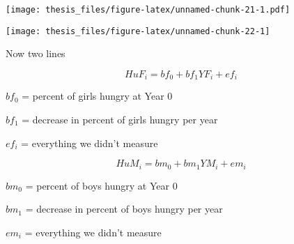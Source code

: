 \documentclass[12pt,openright,oneside,a4paper,chapter=TITLE,section=TITLE,subsection=Title,english,french,spanish,portugues,sumario=tradicional]{04-class-files/abntex2}
\newenvironment{Shaded}{\begin{snugshade}}{\end{snugshade}}
\newcommand{\DataTypeTok}[1]{\textcolor[rgb]{0.13,0.29,0.53}{#1}}
\newcommand{\DecValTok}[1]{\textcolor[rgb]{0.00,0.00,0.81}{#1}}
\newcommand{\KeywordTok}[1]{\textcolor[rgb]{0.13,0.29,0.53}{\textbf{#1}}}
\newcommand{\NormalTok}[1]{#1}
\newcommand{\OperatorTok}[1]{\textcolor[rgb]{0.81,0.36,0.00}{\textbf{#1}}}
\newcommand{\StringTok}[1]{\textcolor[rgb]{0.31,0.60,0.02}{#1}}
\begin{document}
\texttt{[image: thesis\_files/figure-latex/unnamed-chunk-21-1.pdf]}

\begin{Shaded}
\end{Shaded}

\begin{center}\texttt{[image: thesis\_files/figure-latex/unnamed-chunk-22-1]} \end{center}

Now two lines

\[HuF_i = bf_0 + bf_1 YF_i + ef_i\]

\(bf_0\) = percent of girls hungry at Year 0

\(bf_1\) = decrease in percent of girls hungry per year

\(ef_i\) = everything we didn't measure

\[HuM_i = bm_0 + bm_1 YM_i + em_i\]

\(bm_0\) = percent of boys hungry at Year 0

\(bm_1\) = decrease in percent of boys hungry per year

\(em_i\) = everything we didn't measure

\begin{Shaded}
\end{Shaded}
\end{document}
